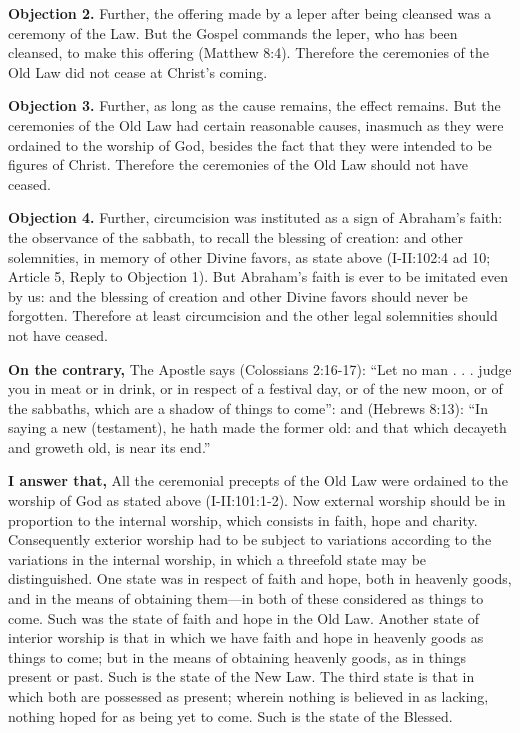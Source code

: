 \textbf{Objection 2.} Further, the offering made by a leper after being cleansed was a ceremony of the Law. But the Gospel commands the leper, who has been cleansed, to make this offering (Matthew 8:4). Therefore the ceremonies of the Old Law did not cease at Christ's coming.

\textbf{Objection 3.} Further, as long as the cause remains, the effect remains. But the ceremonies of the Old Law had certain reasonable causes, inasmuch as they were ordained to the worship of God, besides the fact that they were intended to be figures of Christ. Therefore the ceremonies of the Old Law should not have ceased.

\textbf{Objection 4.} Further, circumcision was instituted as a sign of Abraham's faith: the observance of the sabbath, to recall the blessing of creation: and other solemnities, in memory of other Divine favors, as state above (I-II:102:4 ad 10; Article 5, Reply to Objection 1). But Abraham's faith is ever to be imitated even by us: and the blessing of creation and other Divine favors should never be forgotten. Therefore at least circumcision and the other legal solemnities should not have ceased.

\textbf{On the contrary,} The Apostle says (Colossians 2:16-17): ``Let no man . . . judge you in meat or in drink, or in respect of a festival day, or of the new moon, or of the sabbaths, which are a shadow of things to come'': and (Hebrews 8:13): ``In saying a new (testament), he hath made the former old: and that which decayeth and groweth old, is near its end.''

\textbf{I answer that,} All the ceremonial precepts of the Old Law were ordained to the worship of God as stated above (I-II:101:1-2). Now external worship should be in proportion to the internal worship, which consists in faith, hope and charity. Consequently exterior worship had to be subject to variations according to the variations in the internal worship, in which a threefold state may be distinguished. One state was in respect of faith and hope, both in heavenly goods, and in the means of obtaining them—in both of these considered as things to come. Such was the state of faith and hope in the Old Law. Another state of interior worship is that in which we have faith and hope in heavenly goods as things to come; but in the means of obtaining heavenly goods, as in things present or past. Such is the state of the New Law. The third state is that in which both are possessed as present; wherein nothing is believed in as lacking, nothing hoped for as being yet to come. Such is the state of the Blessed.

